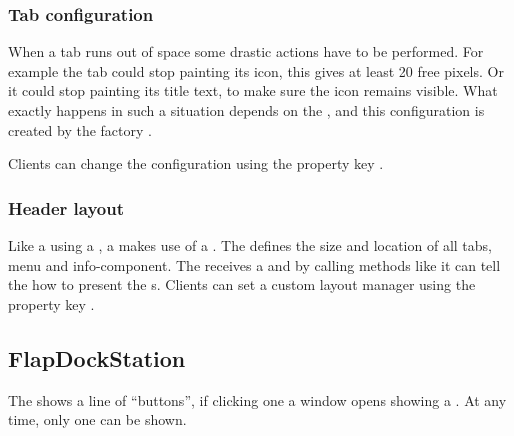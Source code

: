 \subsubsection{Tab configuration}
When a tab runs out of space some drastic actions have to be performed. For example the tab could stop painting its icon, this gives at least 20 free pixels. Or it could stop painting its title text, to make sure the icon remains visible. What exactly happens in such a situation depends on the , and this configuration is created by the factory .

Clients can change the configuration using the property key \linebreak {}.

\subsubsection{Header layout}
Like a  using a , a  makes use of a . The  defines the size and location of all tabs, menu and info-component. The  receives a  and by calling methods like  it can tell the  how to present the s. Clients can set a custom layout manager using the property key .


\subsection{FlapDockStation}
The  shows a line of ``buttons'', if clicking one a window opens showing a . At any time, only one  can be shown.

